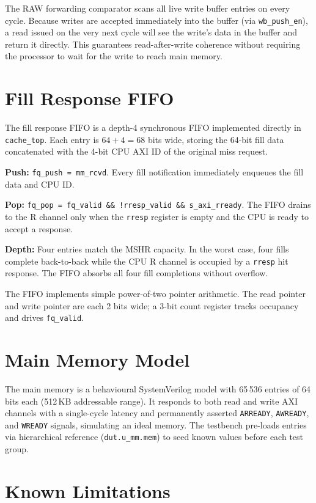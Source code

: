 \documentclass[12pt,letterpaper]{report}
\begin{document}
The RAW forwarding comparator scans all live write buffer entries on
every cycle.  Because writes are accepted immediately into the buffer
(via \texttt{wb\_push\_en}), a read issued on the very next cycle will
see the write's data in the buffer and return it directly.  This
guarantees read-after-write coherence without requiring the processor
to wait for the write to reach main memory.

\section{Fill Response FIFO}
\label{sec:fill_fifo}

The fill response FIFO is a depth-4 synchronous FIFO implemented
directly in \texttt{cache\_top}.  Each entry is $64 + 4 = 68$ bits
wide, storing the 64-bit fill data concatenated with the 4-bit CPU
AXI ID of the original miss request.

\textbf{Push:} \texttt{fq\_push = mm\_rcvd}.  Every fill
notification immediately enqueues the fill data and CPU ID.

\textbf{Pop:} \texttt{fq\_pop = fq\_valid \&\& !rresp\_valid \&\&
s\_axi\_rready}.  The FIFO drains to the R channel only when the
\texttt{rresp} register is empty and the CPU is ready to accept a
response.

\textbf{Depth:} Four entries match the MSHR capacity.  In the worst
case, four fills complete back-to-back while the CPU R channel is
occupied by a \texttt{rresp} hit response.  The FIFO absorbs all four
fill completions without overflow.

The FIFO implements simple power-of-two pointer arithmetic.  The read
pointer and write pointer are each 2 bits wide; a 3-bit count register
tracks occupancy and drives \texttt{fq\_valid}.

\section{Main Memory Model}

The main memory is a behavioural SystemVerilog model with 65\,536
entries of 64 bits each (512\,KB addressable range).  It responds to
both read and write AXI channels with a single-cycle latency and
permanently asserted \texttt{ARREADY}, \texttt{AWREADY}, and
\texttt{WREADY} signals, simulating an ideal memory.  The testbench
pre-loads entries via hierarchical reference (\texttt{dut.u\_mm.mem})
to seed known values before each test group.

\section{Known Limitations}
\label{sec:limitations}
\end{document}

